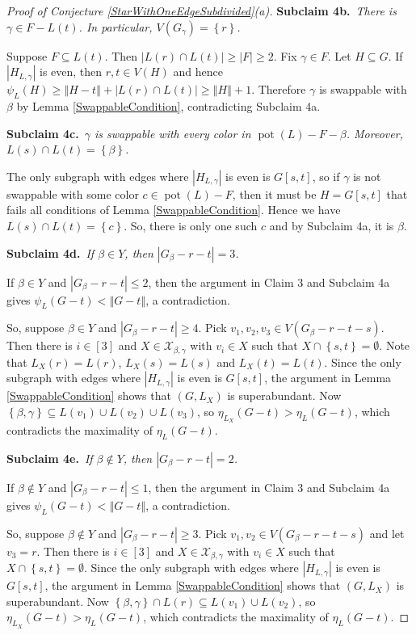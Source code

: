 \documentclass[12pt]{article}
\theoremstyle{plain}
\theoremstyle{definition}
\theoremstyle{remark}
\newcommand{\fancy}[1]{\mathcal{#1}}
\newcommand{\set}[1]{\left\{ #1 \right\}}
\newcommand{\card}[1]{\left|#1\right|}
\newcommand{\size}[1]{\left\Vert#1\right\Vert}
\newcommand{\irange}[1]{\left[#1\right]}
\newcommand{\pot}{\operatorname{pot}}
\def\X{\fancy{X}}
\newcommand{\subclaim}[2]{{\bf Subclaim #1.}~{\it #2}~~}
\begin{document}
\begin{proof} [Proof of Conjecture \ref{StarWithOneEdgeSubdivided}(a)]
	\subclaim{4b}{There is $\gamma \in F - L(t)$. In particular, $V(G_\gamma) = \set{r}$.}
	
	Suppose $F \subseteq L(t)$.  Then $\card{L(r) \cap L(t)} \ge |F| \ge 2$.  Fix $\gamma \in F$. Let $H \subseteq G$.  If $\card{H_{L, \gamma}}$ is even, then $r, t \in V(H)$ and hence $\psi_L(H) \ge \size{H-t} + \card{L(r) \cap L(t)} \ge \size{H} + 1$.  Therefore $\gamma$ is swappable with $\beta$ by Lemma \ref{SwappableCondition}, contradicting Subclaim 4a.

	\subclaim{4c}{$\gamma$ is swappable with every color in $\pot(L) - F - \beta$.  Moreover, $L(s) \cap L(t) = \set{\beta}$.}
	
	The only subgraph with edges where $\card{H_{L, \gamma}}$ is even is $G[s, t]$, so if $\gamma$ is not swappable with some color $c \in \pot(L) - F$, then it must be $H = G[s, t]$ that fails all conditions of Lemma \ref{SwappableCondition}.  Hence we have $L(s) \cap L(t) = \set{c}$.  So, there is only one such $c$ and by Subclaim 4a, it is $\beta$.
	
	\subclaim{4d}{If $\beta \in Y$, then $\card{G_\beta - r - t} = 3$.}

	If $\beta \in Y$ and $\card{G_\beta - r - t} \le 2$, then the argument in Claim 3 and Subclaim 4a gives $\psi_L(G - t) < \size{G - t}$, a contradiction.
		
	So, suppose $\beta \in Y$ and $\card{G_\beta - r - t} \ge 4$.  Pick $v_1, v_2, v_3 \in V(G_\beta - r - t - s)$.  Then there is $i \in \irange{3}$ and $X \in \X_{\beta,\gamma}$ with $v_i \in X$ such that $X \cap \set{s,t} = \emptyset$. Note that $L_X(r) = L(r)$, $L_X(s) = L(s)$ and $L_X(t) = L(t)$.  Since the only subgraph with edges where $\card{H_{L, \gamma}}$ is even is $G[s, t]$, the argument in Lemma \ref{SwappableCondition} shows that $(G,L_X)$ is superabundant.  Now $\set{\beta, \gamma} \subseteq L(v_1) \cup L(v_2) \cup L(v_3)$, so $\eta_{L_X}(G - t) > \eta_L(G - t)$, which contradicts the maximality of $\eta_L(G - t)$.

	\subclaim{4e}{If $\beta \not \in Y$, then $\card{G_\beta - r - t} = 2$.}
	
	If $\beta \not \in Y$ and $\card{G_\beta - r - t} \le 1$, then the argument in Claim 3 and Subclaim 4a gives $\psi_L(G - t) < \size{G - t}$, a contradiction.
		
	So, suppose $\beta \not \in Y$ and $\card{G_\beta - r - t} \ge 3$. Pick $v_1, v_2 \in V(G_\beta - r - t - s)$ and let $v_3 = r$.  Then there is $i \in \irange{3}$ and $X \in \X_{\beta,\gamma}$ with $v_i \in X$ such that $X \cap \set{s,t} = \emptyset$.  Since the only subgraph with edges where $\card{H_{L, \gamma}}$ is even is $G[s, t]$, the argument in Lemma \ref{SwappableCondition} shows that $(G,L_X)$ is superabundant.  Now $\set{\beta, \gamma} \cap L(r) \subseteq L(v_1) \cup L(v_2)$, so $\eta_{L_X}(G - t) > \eta_L(G - t)$, which contradicts the maximality of $\eta_L(G - t)$.
	

\end{proof}
\end{document}
